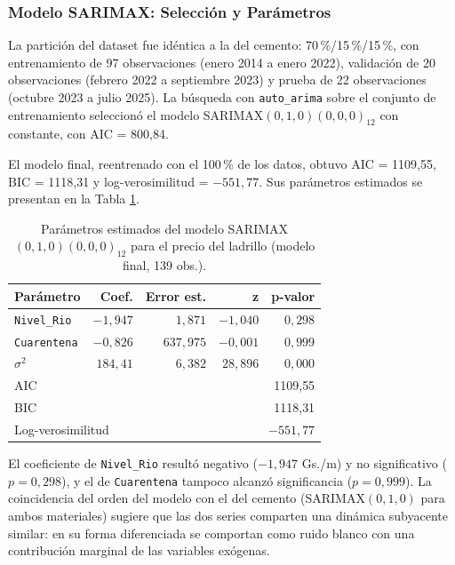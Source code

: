 \subsubsection{Modelo SARIMAX: Selección y Parámetros}

\justify
La partición del dataset fue idéntica a la del cemento: 70\,\%/15\,\%/15\,\%, con entrenamiento de 97 observaciones (enero 2014 a enero 2022), validación de 20 observaciones (febrero 2022 a septiembre 2023) y prueba de 22 observaciones (octubre 2023 a julio 2025). La búsqueda con \texttt{auto\_arima} sobre el conjunto de entrenamiento seleccionó el modelo SARIMAX$(0,1,0)(0,0,0)_{12}$ con constante, con AIC = 800{,}84.

\justify
El modelo final, reentrenado con el 100\,\% de los datos, obtuvo AIC = 1109{,}55, BIC = 1118{,}31 y log-verosimilitud = $-551{,}77$. Sus parámetros estimados se presentan en la Tabla \ref{tab:sarimax_ladrillo_params}.

\begin{table}[H]
    \centering
    \caption{Parámetros estimados del modelo SARIMAX$(0,1,0)(0,0,0)_{12}$ para el precio del ladrillo (modelo final, 139 obs.).}
    \label{tab:sarimax_ladrillo_params}
    \begin{tabular}{lrrrr}
        \toprule
        \textbf{Parámetro} & \textbf{Coef.} & \textbf{Error est.} & \textbf{z} & \textbf{p-valor} \\
        \midrule
        \texttt{Nivel\_Rio}  & $-1{,}947$ & $1{,}871$ & $-1{,}040$ & $0{,}298$ \\
        \texttt{Cuarentena}  & $-0{,}826$ & $637{,}975$ & $-0{,}001$ & $0{,}999$ \\
        $\sigma^{2}$         & $184{,}41$ & $6{,}382$ & $28{,}896$ & $0{,}000$ \\
        \midrule
        \multicolumn{2}{l}{AIC} & \multicolumn{3}{r}{1109{,}55} \\
        \multicolumn{2}{l}{BIC} & \multicolumn{3}{r}{1118{,}31} \\
        \multicolumn{2}{l}{Log-verosimilitud} & \multicolumn{3}{r}{$-551{,}77$} \\
        \bottomrule
    \end{tabular}
\end{table}

\justify
El coeficiente de \texttt{Nivel\_Rio} resultó negativo ($-1{,}947$ Gs./m) y no significativo ($p = 0{,}298$), y el de \texttt{Cuarentena} tampoco alcanzó significancia ($p = 0{,}999$). La coincidencia del orden del modelo con el del cemento (SARIMAX$(0,1,0)$ para ambos materiales) sugiere que las dos series comparten una dinámica subyacente similar: en su forma diferenciada se comportan como ruido blanco con una contribución marginal de las variables exógenas.


